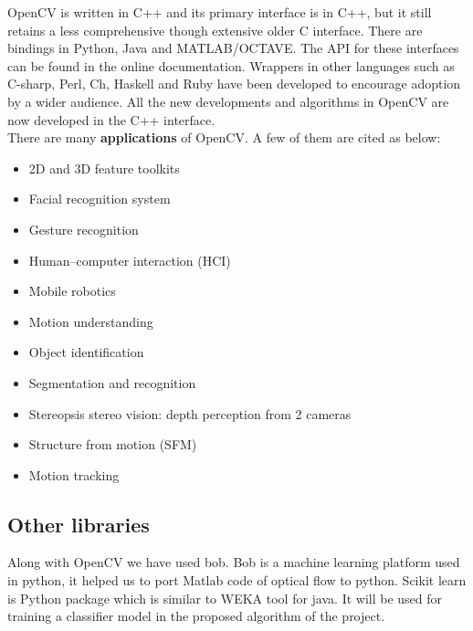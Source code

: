 OpenCV is written in C++ and its primary interface is in C++, but it still retains a less comprehensive though extensive older C interface. There are bindings in Python, Java and MATLAB/OCTAVE. The API for these interfaces	can be found in the online documentation. Wrappers in other languages such as C-sharp, Perl, Ch, Haskell and Ruby have been developed to encourage adoption by a wider audience. All the new developments and algorithms in OpenCV are now developed in the C++ interface.\\
There are many \textbf{applications} of OpenCV. A few of them are cited as below:
\begin{itemize}
\item 2D and 3D feature toolkits 
\item Facial recognition system 
\item Gesture recognition 
\item Human–computer interaction (HCI) 
\item Mobile robotics 
\item Motion understanding 
\item Object identification 
\item Segmentation and recognition 
\item Stereopsis stereo vision: depth perception from 2 cameras 
\item Structure from motion (SFM) 
\item Motion tracking 
\end{itemize}

\subsection{Other libraries}
Along with OpenCV we have used bob. Bob is a machine learning platform used in python, it helped us to port Matlab code of optical flow to python. Scikit learn is Python package which is similar to WEKA tool for java. It will be used for training a classifier model in the proposed algorithm of the project.


